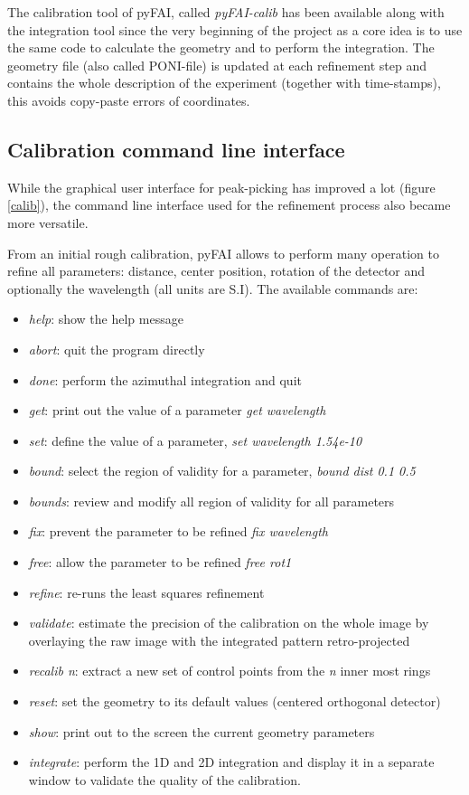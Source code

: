 \documentclass[preprint]{iucr}
\begin{document}
The calibration tool of pyFAI, called \textit{pyFAI-calib} has been available
along with the integration tool since the very beginning of the project as a core idea
is to use the same code to calculate the geometry and to perform the integration.
The geometry file (also called PONI-file) is updated at each refinement step and
contains the whole description of the experiment (together with time-stamps),
this avoids copy-paste errors of coordinates.

\subsection{Calibration command line interface}

While the graphical user interface for peak-picking has improved a
lot (figure \ref{calib}), the command line interface used for the refinement
process also became more versatile.

From an initial rough calibration, pyFAI allows to perform many operation to
refine all parameters: distance, center position, rotation of the detector and
optionally the wavelength (all units are S.I).
The available commands are:
\begin{itemize}
\item \textit{help}: show the help message
\item \textit{abort}: quit the program directly
\item \textit{done}: perform the azimuthal integration and quit
\item \textit{get}: print out the value of a parameter \textit{get wavelength}
\item \textit{set}: define the value of a parameter, \textit{set wavelength 1.54e-10}
\item \textit{bound}: select the region of validity for a parameter, \textit{bound
dist 0.1 0.5}
\item \textit{bounds}: review and modify all region of validity for all parameters
\item \textit{fix}: prevent the parameter to be refined \textit{fix wavelength}
\item \textit{free}: allow the parameter to be refined \textit{free rot1}
\item \textit{refine}: re-runs the least squares refinement
\item \textit{validate}: estimate the precision of the calibration on the whole
image by overlaying the raw image with the integrated pattern retro-projected
\item \textit{recalib n}: extract a new set of control points from the
\textit{n} inner most rings
\item \textit{reset}: set the geometry to its default values (centered orthogonal detector)
\item \textit{show}: print out to the screen the current geometry parameters
\item \textit{integrate}: perform the 1D and 2D integration and display it in a
separate window to validate the quality of the calibration.
\end{itemize}
\end{document}

